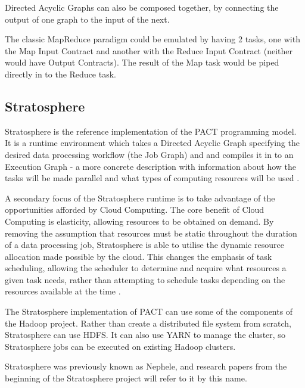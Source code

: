 Directed Acyclic Graphs can also be composed together, by connecting the output of one graph to the input of the next.

The classic MapReduce paradigm could be emulated by having 2 tasks, one with the Map Input Contract and another with the Reduce Input Contract (neither would have Output Contracts). The result of the Map task would be piped directly in to the Reduce task. 

\subsection{Stratosphere}

Stratosphere is the reference implementation of the PACT programming model. It is a runtime environment which takes a Directed Acyclic Graph specifying the desired data processing workflow (the Job Graph) and and compiles it in to an Execution Graph - a more concrete description with information about how the tasks will be made parallel and what types of computing resources will be used \cite{warneke2011exploiting}. 

A secondary focus of the Stratosphere runtime is to take advantage of the opportunities afforded by Cloud Computing. The core benefit of Cloud Computing is elasticity, allowing resources to be obtained on demand. By removing the assumption that resources must be static throughout the duration of a data processing job, Stratosphere is able to utilise the dynamic resource allocation made possible by the cloud. This changes the emphasis of task scheduling, allowing the scheduler to determine and acquire what resources a given task needs, rather than attempting to schedule tasks depending on the resources available at the time \cite{warneke2011exploiting}.

The Stratosphere implementation of PACT can use some of the components of the Hadoop project. Rather than create a distributed file system from scratch, Stratosphere can use HDFS. It can also use YARN to manage the cluster, so Stratosphere jobs can be executed on existing Hadoop clusters.

Stratosphere was previously known as Nephele, and research papers from the beginning of the Stratosphere project will refer to it by this name.

